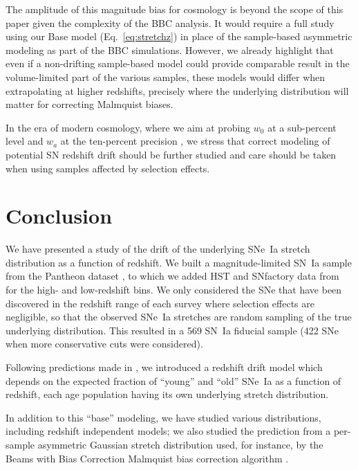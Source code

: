 \documentclass[]{aa}
\begin{document}
The amplitude of this magnitude bias for cosmology is beyond the scope of this
paper given the complexity of the BBC analysis. It would require a full study
using our Base model (Eq.~\ref{eq:stretchz}) in place of the sample-based
asymmetric modeling as part of the BBC simulations. However, we already
highlight that even if a non-drifting sample-based model could provide
comparable result in the volume-limited part of the various samples, these
models would differ when extrapolating at higher redshifts, precisely where the
underlying distribution will matter for correcting Malmquist biases.

In the era of modern cosmology, where we aim at probing $w_0$ at a sub-percent
level and $w_a$ at the ten-percent precision \citep[e.g.,][]{lsstpaper}, we
stress that correct modeling of potential SN redshift drift should be further
studied and care should be taken when using samples affected by selection
effects.

\section{Conclusion}\label{sec:ccl}

We have presented a study of the drift of the underlying SNe~Ia stretch
distribution as a function of redshift. We built a magnitude-limited SN~Ia
sample from the Pantheon dataset \citep[][SDSS, PS1 and SNLS]{scolnic2018a}, to
which we added HST and SNfactory data from \cite{rigault2018} for the high- and
low-redshift bins. We only considered the SNe that have been discovered in the
redshift range of each survey where selection effects are negligible, so that
the observed SNe~Ia stretches are random sampling of the true underlying
distribution. This resulted in a 569 SN~Ia fiducial sample (422 SNe when more
conservative cuts were considered).

Following predictions made in \cite{rigault2018}, we introduced a redshift drift
model which depends on the expected fraction of ``young'' and ``old'' SNe~Ia as
a function of redshift, each age population having its own underlying
stretch distribution.

In addition to this ``base'' modeling, we have studied various distributions,
including redshift independent models; we also studied the prediction from a
per-sample asymmetric Gaussian stretch distribution used, for instance, by the
Beams with Bias Correction Malmquist bias correction algorithm
\citep{scolnic2016, kessler2017}.
\end{document}
